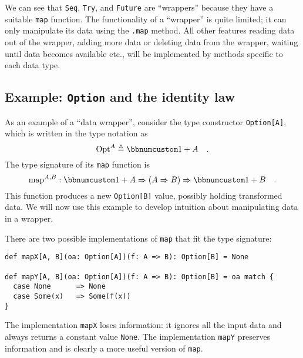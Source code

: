 We can see that \lstinline!Seq!, \lstinline!Try!, and \lstinline!Future!
are ``wrappers'' because they have a suitable \lstinline!map! function.
The functionality of a ``wrapper'' is quite limited; it can only
manipulate its data using the \lstinline!.map! method. All other
features \textendash{} reading data out of the wrapper, adding more
data or deleting data from the wrapper, waiting until data becomes
available etc., \textendash{} will be implemented by methods specific
to each data type.

\subsection{Example: \texttt{Option} and the identity law\label{subsec:f-Example:-Option-and}}

As an example of a ``data wrapper'', consider the type constructor
\lstinline!Option[A]!, which is written in the type notation as 
\[
\text{Opt}^{A}\triangleq\bbnum 1+A\quad.
\]
The type signature of its \lstinline!map! function is
\[
\text{map}^{A,B}:\bbnum 1+A\Rightarrow\left(A\Rightarrow B\right)\Rightarrow\bbnum 1+B\quad.
\]
This function produces a new \lstinline!Option[B]! value, possibly
holding transformed data. We will now use this example to develop
intuition about manipulating data in a wrapper.

There are two possible implementations of \lstinline!map! that fit
the type signature:
\begin{lstlisting}
def mapX[A, B](oa: Option[A])(f: A => B): Option[B] = None

def mapY[A, B](oa: Option[A])(f: A => B): Option[B] = oa match {
  case None      => None
  case Some(x)   => Some(f(x))
}
\end{lstlisting}
The implementation \lstinline!mapX! loses information:
it ignores all the input data and always returns a constant value
\lstinline!None!. The implementation \lstinline!mapY! preserves
information and is clearly a more useful version of \lstinline!map!. 


